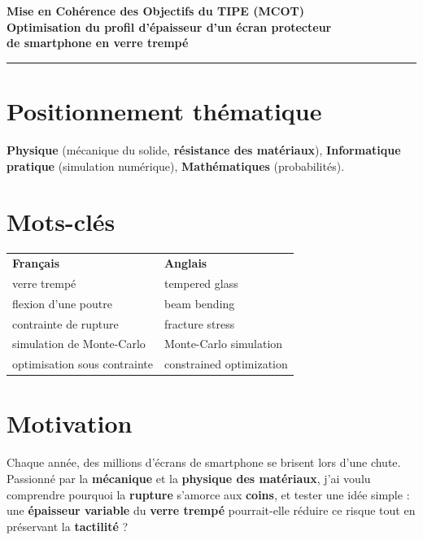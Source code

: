 \documentclass[11pt,a4paper]{article}
\begin{document}
\begin{center}
{\Large\bfseries Mise en Cohérence des Objectifs du TIPE (MCOT)}\\[6pt]
{\large\bfseries Optimisation du profil d'épaisseur d'un écran protecteur\\
de smartphone en verre trempé}\\[8pt]
\end{center}
\hrule
\bigskip

\section{Positionnement thématique}
\textbf{Physique} (mécanique du solide, \textbf{résistance des matériaux}),
\textbf{Informatique pratique} (simulation numérique),
\textbf{Mathématiques} (probabilités).

\section{Mots-clés}
\begin{center}\small
\begin{tabular}{ll}
\textbf{Français} & \textbf{Anglais} \\[2pt]
verre trempé & tempered glass \\
flexion d'une poutre & beam bending \\
contrainte de rupture & fracture stress \\
simulation de Monte-Carlo & Monte-Carlo simulation \\
optimisation sous contrainte & constrained optimization \\
\end{tabular}
\end{center}

\section{Motivation}
Chaque année, des millions d'écrans de smartphone se brisent lors d'une
chute. Passionné par la \textbf{mécanique} et la \textbf{physique des
matériaux}, j'ai voulu comprendre pourquoi la \textbf{rupture} s'amorce
aux \textbf{coins}, et tester une idée simple : une
\textbf{épaisseur variable} du \textbf{verre trempé} pourrait-elle réduire ce
risque tout en préservant la \textbf{tactilité} ?
\end{document}
